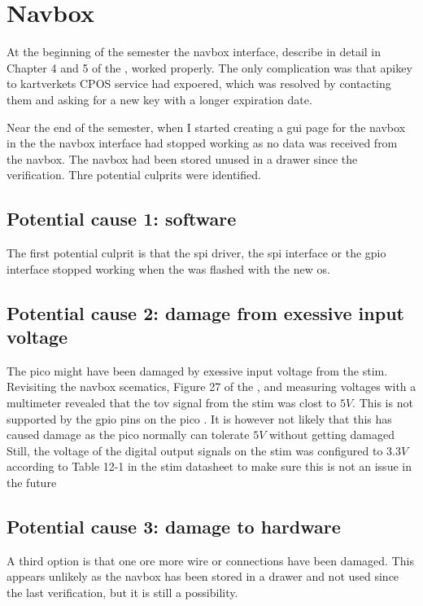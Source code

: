 \section{Navbox}
At the beginning of the semester the \gls{navbox} interface, describe in detail in Chapter 4 and 5 of the \preproject, worked properly.
The only complication was that \gls{apikey} to \gls{kartverket}s CPOS service had expoered, which was resolved by contacting them and asking for a new key with a longer expiration date.

Near the end of the semester, when I started creating a \gls{gui} page for the \gls{navbox} in the \srgui the \gls{navbox} interface had stopped working as no data was received from the \gls{navbox}.
The \gls{navbox} had been stored unused in a drawer since the verification.
Thre potential culprits were identified.

\subsection{Potential cause 1: \jx software}
The first potential culprit is that the \gls{spi} driver, the \gls{spi} \py interface or the \gls{gpio} interface stopped working when the \jx was flashed with the new \gls{os}.

\subsection{Potential cause 2: damage from exessive input voltage}
The \gls{pico} might have been damaged by exessive input voltage from the \gls{stim}.
Revisiting the \gls{navbox} scematics, Figure 27 of the \preproject, and measuring voltages with a multimeter revealed that the \gls{tov} signal from the \gls{stim} was clost to $5V$.
This is not supported by the \gls{gpio} pins on the \gls{pico} \cite[17]{PicoDatasheet}.
It is however not likely that this has caused damage as the \gls{pico} normally can tolerate $5V$ without getting damaged \cite{aryavoronovaRP20405VLogic2023}
Still, the voltage of the digital output signals on the \gls{stim} was configured to $3.3V$ according to Table 12-1 in the \gls{stim} datasheet to make sure this is not an issue in the future \cite[118]{safranSTIM300Datasheet}

\subsection{Potential cause 3: damage to hardware}
A third option is that one ore more wire or connections have been damaged.
This appears unlikely as the \gls{navbox} has been stored in a drawer and not used since the last verification, but it is still a possibility.


